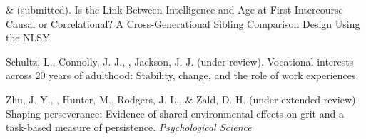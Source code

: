 \begin{etaremune}
\item\meb \& \Joe (submitted). Is the Link Between Intelligence and Age at First Intercourse Causal or Correlational? A Cross-Generational Sibling Comparison Design Using the NLSY %
\item Schultz, L., Connolly, J. J., \meb, Jackson, J. J. (under review). Vocational interests across 20 years of adulthood: Stability, change, and the role of work experiences. %
\item Zhu, J. Y., \meb, Hunter, M., Rodgers, J. L., \& Zald, D. H. (under extended review). Shaping perseverance: Evidence of shared environmental effects on grit and a task-based measure of persistence. \textit{Psychological Science}
\end{etaremune}
